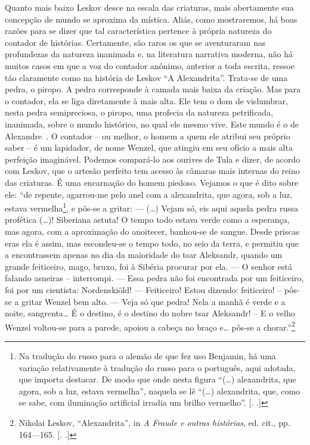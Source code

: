 Quanto mais baixo Leskov desce na escala das criaturas, mais abertamente
sua concepção de mundo se aproxima da mística. Aliás, como mostraremos,
há boas razões para se dizer que tal característica pertence à própria
natureza do contador de histórias. Certamente, são raros os que se
aventuraram nas profundezas da natureza inanimada e, na literatura
narrativa moderna, não há muitos casos em que a voz do contador anônimo,
anterior a toda escrita, ressoe tão claramente como na história de
Leskov ``A Alexandrita''. Trata-se de uma pedra, o piropo. A pedra
corresponde à camada mais baixa da criação. Mas para o contador, ela se
liga diretamente à mais alta. Ele tem o dom de vislumbrar, nesta pedra
semipreciosa, o piropo, uma profecia da natureza petrificada, inanimada,
sobre o mundo histórico, no qual ele mesmo vive. Este mundo é o de
Alexandre~. O contador -- ou melhor, o homem a quem ele atribui seu
próprio saber -- é um lapidador, de nome Wenzel, que atingiu em seu
ofício a mais alta perfeição imaginável. Podemos compará-lo aos ourives
de Tula e dizer, de acordo com Leskov, que o artesão perfeito tem acesso
às câmaras mais internas do reino das criaturas. É uma encarnação do
homem piedoso. Vejamos o que é dito sobre ele: ``de repente, agarrou-me
pelo anel com a alexandrita, que agora, sob a luz, estava
vermelha\footnote{Na tradução do russo para o alemão de que fez uso
  Benjamin, há uma variação relativamente à tradução do russo para o
  português, aqui adotada, que importa destacar. De modo que onde nesta
  figura ``(\ldots{}) alexandrita, que agora, sob a luz, estava
  vermelha'', naquela se lê ``(\ldots{}) alexandrita, que, como se sabe,
  com iluminação artificial irradia um brilho vermelho''. [. .]}, e pôs-se a gritar: --- (\ldots{}) Vejam só, eis aqui aquela pedra
russa profética (\ldots{})! Siberiana astuta! O tempo todo estava verde como
a esperança, mas agora, com a aproximação do anoitecer, banhou-se de
sangue. Desde priscas eras ela é assim, mas escondeu-se o tempo todo, no
seio da terra, e permitiu que a encontrassem apenas no dia da maioridade
do tsar Aleksandr, quando um grande feiticeiro, mago, bruxo, foi à
Sibéria procurar por ela. --- O senhor está falando asneiras --
interrompi. --- Essa pedra não foi encontrada por um feiticeiro, foi por
um cientista: Nordenskiöld! --- Feiticeiro! Estou dizendo: feiticeiro! --
pôs-se a gritar Wenzel bem alto. --- Veja só que pedra! Nela a manhã é
verde e a noite, sangrenta\ldots{} É o destino, é o destino do nobre tsar
Aleksandr! -- E o velho Wenzel voltou-se para a parede, apoiou a cabeça no
braço e\ldots{} pôs-se a chorar.''\footnote{Nikolai Leskov, ``Alexandrita'',
  in \emph{A Fraude e outras histórias}, ed. cit., pp. 164---165. [. .]}

